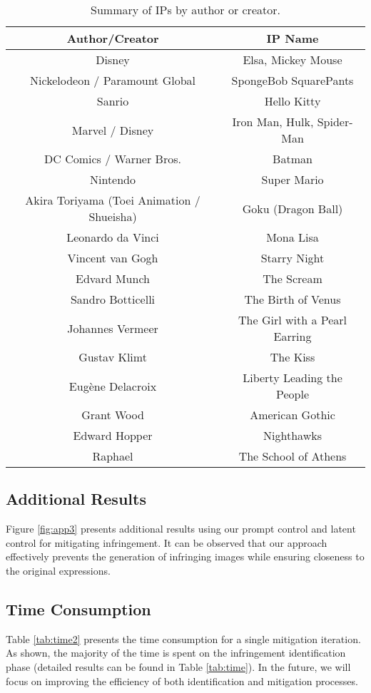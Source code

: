 \begin{table}[h]
    \centering
    \begin{footnotesize}
    \begin{tabular}{c|c}
         \hline
    \textbf{Author/Creator} & \textbf{IP Name} \\
    \hline
    Disney & Elsa, Mickey Mouse \\
    Nickelodeon / Paramount Global & SpongeBob SquarePants \\
    Sanrio & Hello Kitty \\
    Marvel / Disney & Iron Man, Hulk, Spider-Man \\
    DC Comics / Warner Bros. & Batman \\
    Nintendo & Super Mario \\
    Akira Toriyama (Toei Animation / Shueisha) & Goku (Dragon Ball) \\
    \hline
    Leonardo da Vinci & Mona Lisa \\
    Vincent van Gogh & Starry Night \\
    Edvard Munch & The Scream \\
    Sandro Botticelli & The Birth of Venus \\
    Johannes Vermeer & The Girl with a Pearl Earring \\
    Gustav Klimt & The Kiss \\
    Eugène Delacroix & Liberty Leading the People \\
    Grant Wood & American Gothic \\
    Edward Hopper & Nighthawks \\
    Raphael & The School of Athens \\
    \hline
    \end{tabular}
    \caption{Summary of IPs by author or creator.}
    \label{tab:ip}
    \end{footnotesize}
\end{table}

\subsection{Additional Results}
\label{resultB}

Figure \ref{fig:app3} presents additional results using our prompt control and latent control for mitigating infringement. It can be observed that our approach effectively prevents the generation of infringing images while ensuring closeness to the original expressions.

\subsection{Time Consumption}
\label{timeB}
Table \ref{tab:time2} presents the time consumption for a single mitigation iteration. As shown, the majority of the time is spent on the infringement identification phase (detailed results can be found in Table \ref{tab:time}). In the future, we will focus on improving the efficiency of both identification and mitigation processes.

